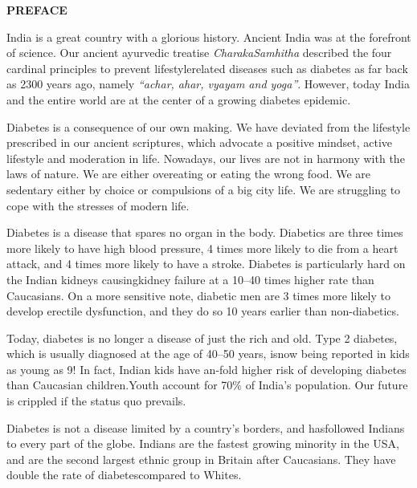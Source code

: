 \thispagestyle{empty}


\begin{center}
\Huge\textbf{PREFACE}
\end{center}

\vskip 20pt

India is a great country with a glorious history. Ancient India was at the forefront of science. Our ancient ayurvedic treatise \textit{Charaka\break Samhitha} described the four cardinal principles to prevent lifestyle\break related diseases such as diabetes as far back as 2300 years ago, namely \textit{“achar, ahar, vyayam and yoga”}. However, today India and the entire world are at the center of a growing diabetes epidemic.

Diabetes is a consequence of our own making. We have deviated from the lifestyle prescribed in our ancient scriptures, which advocate a positive mindset, active lifestyle and moderation in life. Nowadays, our lives are not in harmony with the laws of nature. We are either overeating or eating the wrong food. We are sedentary either by choice or compulsions of a big city life. We are struggling to cope with the stresses of modern life.

Diabetes is a disease that spares no organ in the body. Diabetics are three times more likely to have high blood pressure, 4 times more likely to die from a heart attack, and 4 times more likely to have a stroke. Diabetes is particularly hard on the Indian kidneys causing\break kidney failure at a 10–40 times higher rate than Caucasians. On a more sensitive note, diabetic men are 3 times more likely to develop erectile dysfunction, and they do so 10 years earlier than non-diabetics.

Today, diabetes is no longer a disease of just the rich and old. Type 2 diabetes, which is usually diagnosed at the age of 40–50 years, is\break now being reported in kids as young as 9! In fact, Indian kids have an-fold higher risk of developing diabetes than Caucasian children.\break Youth account for 70\% of India's population. Our future is crippled if the status quo prevails.

Diabetes is not a disease limited by a country's borders, and has\break followed Indians to every part of the globe. Indians are the fastest growing minority in the USA, and are the second largest ethnic group in Britain after Caucasians. They have double the rate of diabetes\break compared to Whites.


